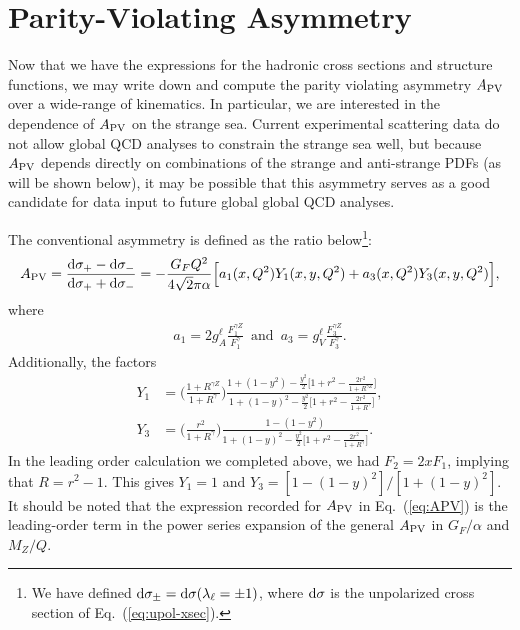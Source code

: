 \documentclass[aps,prd,amsmath,superscriptaddress,floatfix,nofootinbib]{revtex4-2}
\newcommand{\diff}[1]{{\rm d} #1}
\newcommand{\APV}{A_{\rm PV}}
\newcommand{\eref}[1]{Eq.~(\ref{eq:#1})}
\begin{document}
\section{Parity-Violating Asymmetry}
\label{sec:parity-violating-asymmetry}

Now that we have the expressions for the hadronic cross sections and structure functions, we may write down and compute the parity violating asymmetry $\APV$ over a wide-range of kinematics.
In particular, we are interested in the dependence of $\APV$ on the strange sea.
Current experimental scattering data do not allow global QCD analyses to constrain the strange sea well, but because $\APV$ depends directly on combinations of the strange and anti-strange PDFs (as will be shown below), it may be possible that this asymmetry serves as a good candidate for data input to future global global QCD analyses.

The conventional asymmetry is defined as the ratio below\footnote{We have defined $\diff \sigma_{\pm} = \diff \sigma(\lambda_{\ell} = \pm 1)$, where $\diff \sigma$ is the unpolarized cross section of \eref{upol-xsec}.}:
\begin{eqnarray}
    \label{eq:APV}
    \APV = \frac{\diff \sigma_{+} - \diff \sigma_{-}}{\diff \sigma_{+} + \diff \sigma_{-}} = -\frac{G_{F} Q^2}{4 \sqrt{2} \pi \alpha} \Big[ a_{1}(x,Q^2)Y_{1}(x,y,Q^2) + a_{3}(x,Q^2) Y_{3}(x,y,Q^2) \Big]
,\end{eqnarray}
where
\begin{eqnarray}
    \label{eq:a13}
    a_{1} = 2 g_{A}^{\ell} \frac{F_{1}^{\gamma Z}}{F_{1}^{\gamma}} \, \mbox{ and } \, a_{3} = g_{V}^{\ell} \frac{F_{3}^{\gamma Z}}{F_{3}^{\gamma}}
.\end{eqnarray}
Additionally, the factors
\begin{align}
    \label{eq:Y13}
    Y_{1} &= \Bigg( \frac{1 + R^{\gamma Z}}{1 + R^{\gamma}} \Bigg) \frac{1 + (1-y^2) - \frac{y^2}{2} \Big[ 1 + r^2 - \frac{2r^2}{1 + R^{\gamma Z}} \Big]}{1 + (1-y)^2 - \frac{y^2}{2}\Big[ 1 + r^2 - \frac{2r^2}{1 + R^{\gamma}} \Big]}, \\
    Y_{3} &= \Bigg( \frac{r^2}{1 + R^{\gamma}} \Bigg) \frac{1 - (1-y^2)}{1 + (1-y)^2 - \frac{y^2}{2}\Big[ 1 + r^2 - \frac{2r^2}{1 + R^{\gamma}} \Big]}
.\end{align}
In the leading order calculation we completed above, we had $F_2 = 2x F_1$, implying that $R = r^2 - 1$.
This gives $Y_{1} = 1$ and $Y_{3} = [1 - (1-y)^2]/[1 + (1-y)^2]$.
It should be noted that the expression recorded for $\APV$ in \eref{APV} is the leading-order term in the power series expansion of the general $\APV$ in $G_{F}/\alpha$ and $M_{Z} / Q$.
\end{document}
